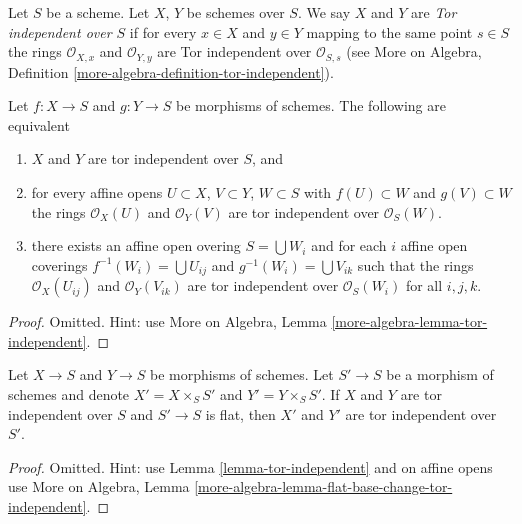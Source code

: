 \begin{definition}
\label{definition-tor-independent}
Let $S$ be a scheme. Let $X$, $Y$ be schemes over $S$. We say $X$ and
$Y$ are {\it Tor independent over $S$} if for every $x \in X$ and
$y \in Y$ mapping to the same point $s \in S$ the rings
$\mathcal{O}_{X, x}$ and $\mathcal{O}_{Y, y}$ are Tor independent
over $\mathcal{O}_{S, s}$ (see
More on Algebra, Definition \ref{more-algebra-definition-tor-independent}).
\end{definition}

\begin{lemma}
\label{lemma-tor-independent}
Let $f : X \to S$ and $g : Y \to S$ be morphisms of schemes.
The following are equivalent
\begin{enumerate}
\item $X$ and $Y$ are tor independent over $S$, and
\item for every affine opens $U \subset X$, $V \subset Y$, $W \subset S$
with $f(U) \subset W$ and $g(V) \subset W$ the rings
$\mathcal{O}_X(U)$ and $\mathcal{O}_Y(V)$ are tor independent over
$\mathcal{O}_S(W)$.
\item there exists an affine open overing $S = \bigcup W_i$ and
for each $i$ affine open coverings $f^{-1}(W_i) = \bigcup U_{ij}$
and $g^{-1}(W_i) = \bigcup V_{ik}$ such that the rings
$\mathcal{O}_X(U_{ij})$ and $\mathcal{O}_Y(V_{ik})$ are tor independent over
$\mathcal{O}_S(W_i)$ for all $i, j, k$.
\end{enumerate}
\end{lemma}

\begin{proof}
Omitted. Hint: use More on Algebra, Lemma
\ref{more-algebra-lemma-tor-independent}.
\end{proof}

\begin{lemma}
\label{lemma-flat-base-change-tor-independent}
Let $X \to S$ and $Y \to S$ be morphisms of schemes. Let $S' \to S$ be a
morphism of schemes and denote $X' = X \times_S S'$
and $Y' = Y \times_S S'$.
If $X$ and $Y$ are tor independent over $S$ and $S' \to S$ is flat,
then $X'$ and $Y'$ are tor independent over $S'$.
\end{lemma}

\begin{proof}
Omitted. Hint: use Lemma \ref{lemma-tor-independent} and
on affine opens use More on Algebra, Lemma
\ref{more-algebra-lemma-flat-base-change-tor-independent}.
\end{proof}

